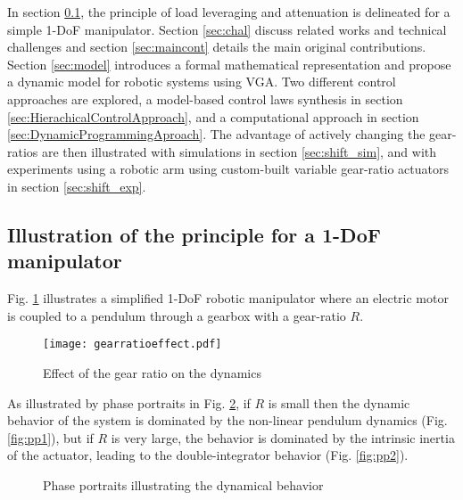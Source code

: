In section \ref{sec:princ}, the principle of load leveraging and attenuation is delineated for a simple 1-DoF manipulator. Section \ref{sec:chal} discuss related works and technical challenges and section \ref{sec:maincont} details the main original contributions. Section \ref{sec:model} introduces a formal mathematical representation and propose a dynamic model for robotic systems using VGA. Two different control approaches are explored, a model-based control laws synthesis in section \ref{sec:HierachicalControlApproach}, and a computational approach in section \ref{sec:DynamicProgrammingAproach}. The advantage of actively changing the gear-ratios are then illustrated with simulations in section \ref{sec:shift_sim}, and with experiments using a robotic arm using custom-built variable gear-ratio actuators in section \ref{sec:shift_exp}.

\subsection{Illustration of the principle for a 1-DoF manipulator}
\label{sec:princ}

Fig. \ref{fig:bigpicture} illustrates a simplified 1-DoF robotic manipulator where an electric motor is coupled to a pendulum through a gearbox with a gear-ratio $R$.
%
\begin{figure}[ht]
	\centering
		\texttt{[image: gearratioeffect.pdf]}
	\caption{Effect of the gear ratio on the dynamics}
	\label{fig:bigpicture}
\end{figure}
%
As illustrated by phase portraits in Fig. \ref{fig:pp}, if $R$ is small then the dynamic behavior of the system is dominated by the non-linear pendulum dynamics (Fig. \ref{fig:pp1}), but if $R$ is very large, the behavior is dominated by the intrinsic inertia of the actuator, leading to the double-integrator behavior (Fig. \ref{fig:pp2}).
%
\begin{figure}[ht]
        \centering
        \caption{Phase portraits illustrating the dynamical behavior}
				\label{fig:pp}
\end{figure}

